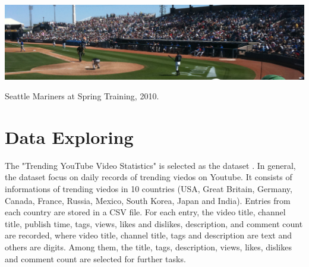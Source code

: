 \documentclass[sigplan,screen]{acmart}
\begin{document}

\begin{teaserfigure}
  \includegraphics[width=\textwidth]{sampleteaser}
  \caption{Seattle Mariners at Spring Training, 2010.}
  \label{fig:teaser}
\end{teaserfigure}



\section{Data Exploring}
The "Trending YouTube Video Statistics" is selected as the dataset \cite{daatset}. In general, the dataset focus on daily records of trending viedos on Youtube. It consists of informations of trending viedos in 10 countries (USA, Great Britain, Germany, Canada, France, Russia, Mexico, South Korea, Japan and India). Entries from each country are stored in a CSV file. For each entry, the video title, channel title, publish time, tags, views, likes and dislikes, description, and comment count are recorded, where video title, channel title, tags and description are text and others are digits. Among them, the title, tags, description, views, likes, dislikes and comment count are selected for further tasks.
\end{document}
